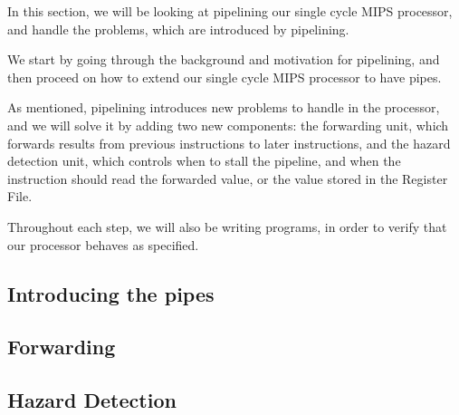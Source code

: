 In this section, we will be looking at pipelining our single cycle MIPS
processor, and handle the problems, which are introduced by pipelining.

We start by going through the background and motivation for pipelining, and
then proceed on how to extend our single cycle MIPS processor to have pipes.

As mentioned, pipelining introduces new problems to handle in the processor,
and we will solve it by adding two new components: the forwarding unit, which
forwards results from previous instructions to later instructions, and the
hazard detection unit, which controls when to stall the pipeline, and when the
instruction should read the forwarded value, or the value stored in the
Register File.

Throughout each step, we will also be writing programs, in order to verify that
our processor behaves as specified.

\subsection{Introducing the pipes}


\subsection{Forwarding}
\subsection{Hazard Detection}
